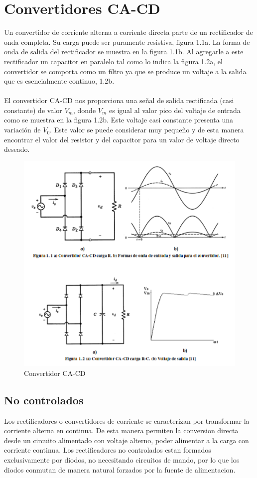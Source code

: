 \documentclass[11pt]{article}
\begin{document}
\section{Convertidores CA-CD}

Un  convertidor  de  corriente  alterna  a  corriente  directa  parte  de  un  rectificador  de  onda  completa.  Su  carga  puede  ser  puramente  resistiva,  figura  1.1a.  La  forma  de  onda  de  salida  del  rectificador  se  muestra  en  la  figura  1.1b.  Al  agregarle  a  este  rectificador  un  capacitor en paralelo tal como lo indica la figura 1.2a, el convertidor se comporta como un filtro ya que se produce un voltaje a la salida que es esencialmente continuo, 1.2b.\\\\
El  convertidor  CA-CD  nos  proporciona  una  señal  de  salida  rectificada  (casi  constante)  de  valor  $V_m$,  donde  $V_m$  es  igual  al  valor  pico  del  voltaje  de  entrada  como  se  muestra  en  la  figura  1.2b.  Este  voltaje  casi  constante  presenta  una  variación  de  $V_0$.  Este  valor  se  puede  considerar  muy  pequeño  y  de  esta  manera  encontrar  el  valor  del  resistor  y  del capacitor para un valor de voltaje directo deseado.
\begin{figure}[htp]
\centering
\includegraphics[scale=0.71]{Convertidor ca-cd.png}
\caption{Convertidor CA-CD}
\label{}
\end{figure}
\subsection{No controlados}
Los rectificadores o convertidores de corriente se caracterizan por transformar la corriente alterna en continua. De esta manera permiten la conversion directa desde un circuito alimentado con voltaje  alterno,  poder  alimentar  a  la  carga  con  corriente  continua.  Los  rectificadores  no  controlados  estan formados exclusivamente por diodos, no necesitando circuitos de mando, por lo que los diodos conmutan de manera natural forzados por la fuente de alimentacion.
\end{document}
